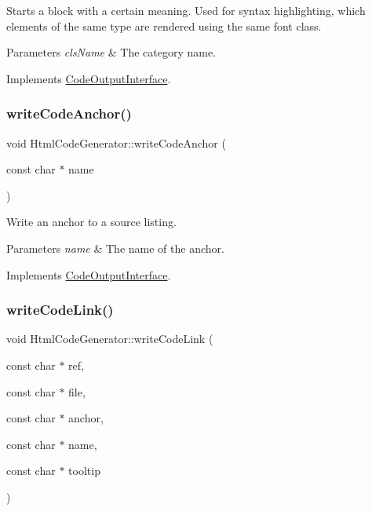 Starts a block with a certain meaning. Used for syntax highlighting, which elements of the same type are rendered using the same \textquotesingle{}font class\textquotesingle{}. 
\begin{DoxyParams}{Parameters}
{\em cls\+Name} & The category name. \\
\hline
\end{DoxyParams}


Implements \mbox{\hyperlink{class_code_output_interface_ac90f75968cdcf127e0b02938bdb49d87}{Code\+Output\+Interface}}.

\mbox{\label{class_html_code_generator_a89ec8d4b9eb2b5162b4d9a7cab209b4a}} 
\subsubsection{\texorpdfstring{writeCodeAnchor()}{writeCodeAnchor()}}
{\footnotesize\ttfamily void Html\+Code\+Generator\+::write\+Code\+Anchor (\begin{DoxyParamCaption}\item[{const char $\ast$}]{name }\end{DoxyParamCaption})\hspace{0.3cm}{\ttfamily [virtual]}}

Write an anchor to a source listing. 
\begin{DoxyParams}{Parameters}
{\em name} & The name of the anchor. \\
\hline
\end{DoxyParams}


Implements \mbox{\hyperlink{class_code_output_interface_a1f6394c4ef7c4143de90bcaf3a65c0b4}{Code\+Output\+Interface}}.

\mbox{\label{class_html_code_generator_a5098b373d91b9674cc399132a321f040}} 
\subsubsection{\texorpdfstring{writeCodeLink()}{writeCodeLink()}}
{\footnotesize\ttfamily void Html\+Code\+Generator\+::write\+Code\+Link (\begin{DoxyParamCaption}\item[{const char $\ast$}]{ref,  }\item[{const char $\ast$}]{file,  }\item[{const char $\ast$}]{anchor,  }\item[{const char $\ast$}]{name,  }\item[{const char $\ast$}]{tooltip }\end{DoxyParamCaption})\hspace{0.3cm}{\ttfamily [virtual]}}

